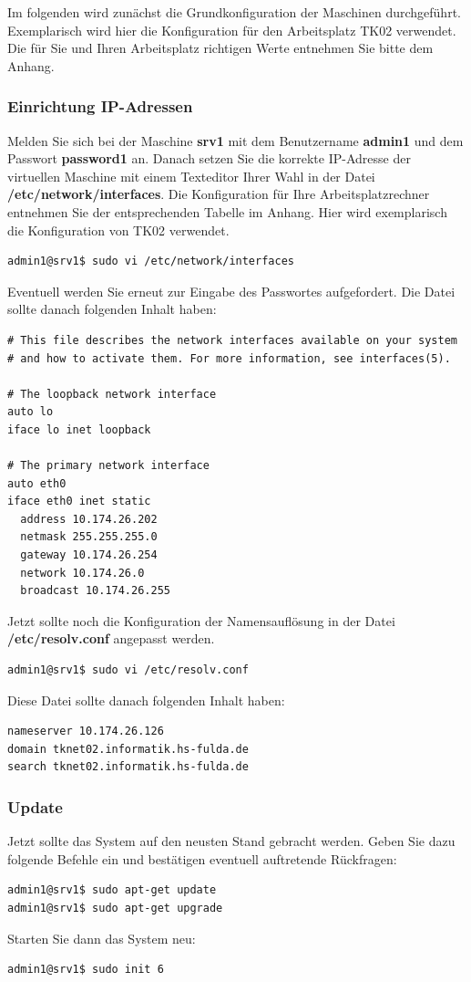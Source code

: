 Im folgenden wird zunächst die Grundkonfiguration der Maschinen durchgeführt. Exemplarisch wird hier die Konfiguration für den Arbeitsplatz TK02 verwendet. Die für Sie
und Ihren Arbeitsplatz richtigen Werte entnehmen Sie bitte dem Anhang.

\subsubsection{Einrichtung IP-Adressen}

Melden Sie sich bei der Maschine \textbf{srv1} mit dem Benutzername \textbf{admin1} und dem Passwort \textbf{password1} an. Danach 
setzen Sie die korrekte IP-Adresse der virtuellen Maschine mit einem Texteditor Ihrer Wahl in der Datei \\
\textbf{/etc/network/interfaces}. Die Konfiguration für Ihre Arbeitsplatzrechner entnehmen Sie der entsprechenden Tabelle im Anhang. Hier wird exemplarisch die Konfiguration
von TK02 verwendet.

\begin{lstlisting}
admin1@srv1$ sudo vi /etc/network/interfaces
\end{lstlisting}
Eventuell werden Sie erneut zur Eingabe des Passwortes aufgefordert. Die Datei sollte danach folgenden Inhalt haben:


\begin{lstlisting}
# This file describes the network interfaces available on your system
# and how to activate them. For more information, see interfaces(5).

# The loopback network interface
auto lo
iface lo inet loopback

# The primary network interface
auto eth0
iface eth0 inet static
  address 10.174.26.202
  netmask 255.255.255.0
  gateway 10.174.26.254
  network 10.174.26.0
  broadcast 10.174.26.255
\end{lstlisting}

Jetzt sollte noch die Konfiguration der Namensauflösung in der Datei \\ \textbf{/etc/resolv.conf} angepasst werden. 
\begin{lstlisting}
admin1@srv1$ sudo vi /etc/resolv.conf
\end{lstlisting}

Diese Datei sollte danach folgenden Inhalt haben:
\begin{lstlisting}
nameserver 10.174.26.126
domain tknet02.informatik.hs-fulda.de
search tknet02.informatik.hs-fulda.de
\end{lstlisting}

\subsubsection{Update}
Jetzt sollte das System auf den neusten Stand gebracht werden. Geben Sie dazu folgende Befehle ein und bestätigen eventuell auftretende Rückfragen:
\begin{lstlisting}
admin1@srv1$ sudo apt-get update
admin1@srv1$ sudo apt-get upgrade
\end{lstlisting}
Starten Sie dann das System neu:
\begin{lstlisting}
admin1@srv1$ sudo init 6
\end{lstlisting}

